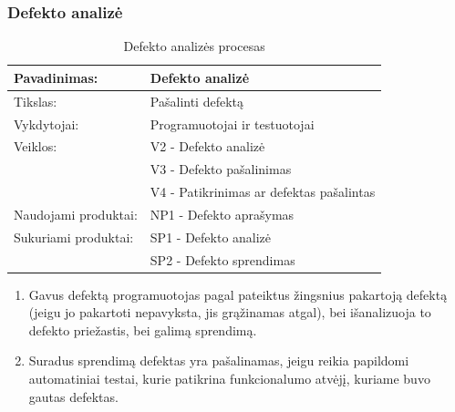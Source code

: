 \documentclass{VUMIFPSkursinis}
\begin{document}
	\subsubsection{Defekto analizė}
	\begin{center}
		\begin{table}[ht]
		\caption{Defekto analizės procesas}
		\begin{tabular}{ | l | l | } 
		\hline
		Pavadinimas:         & Defekto analizė                               \\ \hline
		Tikslas: 	           & Pašalinti defektą\\ \hline
		Vykdytojai:          & Programuotojai ir testuotojai                                \\ \hline
		Veiklos:             & V2 - Defekto analizė \\ 
									  & V3 - Defekto pašalinimas 																			 \\ 
									  & V4 - Patikrinimas ar defektas pašalintas \\ \hline
		Naudojami produktai: & NP1 - Defekto aprašymas																											 \\ \hline
		Sukuriami produktai: & SP1 - Defekto analizė																											\\ 
												& SP2 - Defekto sprendimas \\ \hline
		\end{tabular}
	\end{table}
		\end{center}
		\begin{enumerate}
			\item Gavus defektą programuotojas pagal pateiktus žingsnius pakartoją defektą (jeigu jo pakartoti nepavyksta, jis grąžinamas atgal), bei išanalizuoja to defekto priežastis, bei galimą sprendimą.
			\item Suradus sprendimą defektas yra pašalinamas, jeigu reikia papildomi automatiniai testai, kurie patikrina funkcionalumo atvėjį, kuriame buvo gautas defektas.
		\end{enumerate}
\end{document}
